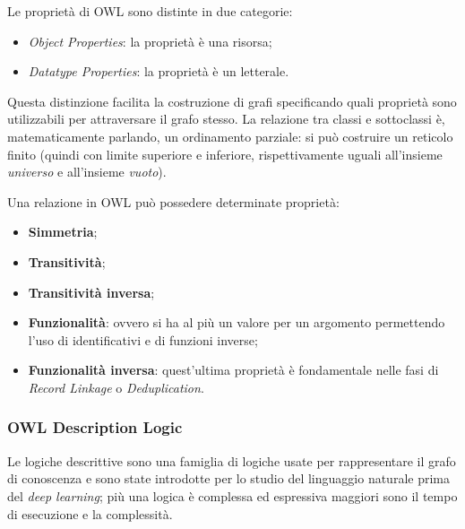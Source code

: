 \documentclass[11pt]{article}
\begin{document}
Le proprietà di OWL sono distinte in due categorie:
\begin{itemize}
  \item \textit{Object Properties}: la proprietà è una risorsa;
  \item \textit{Datatype Properties}: la proprietà è un letterale. 
\end{itemize}
Questa distinzione facilita la costruzione di grafi specificando quali proprietà sono utilizzabili per attraversare il grafo stesso.
La relazione tra classi e sottoclassi è, matematicamente parlando, un ordinamento parziale: si può costruire un reticolo finito (quindi con limite superiore e inferiore, rispettivamente uguali all'insieme \textit{universo} e all'insieme \textit{vuoto}).

Una relazione in OWL può possedere determinate proprietà:
\begin{itemize}[noitemsep]
  \item \textbf{Simmetria};
  \item \textbf{Transitività};
  \item \textbf{Transitività inversa};
  \item \textbf{Funzionalità}: ovvero si ha al più un valore per un argomento permettendo l'uso di identificativi e di funzioni inverse;
  \item \textbf{Funzionalità inversa}: quest'ultima proprietà è fondamentale nelle fasi di \textit{Record Linkage} o \textit{Deduplication}.
\end{itemize}

\subsubsection{OWL Description Logic}
Le logiche descrittive sono una famiglia di logiche usate per rappresentare il grafo di conoscenza e sono state introdotte per lo studio del linguaggio naturale prima del \textit{deep learning}; più una logica è complessa ed espressiva maggiori sono il tempo di esecuzione e la complessità.
\end{document}
